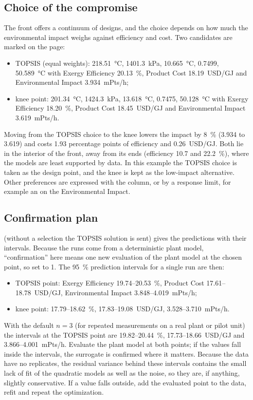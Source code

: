 \subsection{Choice of the compromise}
The front offers a continuum of designs, and the choice depends on how much the environmental impact weighs against
efficiency and cost. Two candidates are marked on the page:
\begin{itemize}
  \item TOPSIS (equal weights): 218.51~°C, 1401.3~kPa, 10.665~°C, 0.7499, 50.589~°C with Exergy Efficiency 20.13~\%,
        Product Cost 18.19~USD/GJ and Environmental Impact 3.934~mPts/h;
  \item knee point: 201.34~°C, 1424.3~kPa, 13.618~°C, 0.7475, 50.128~°C with Exergy Efficiency 18.20~\%, Product
        Cost 18.45~USD/GJ and Environmental Impact 3.619~mPts/h.
\end{itemize}
Moving from the TOPSIS choice to the knee lowers the impact by 8~\% (3.934 to 3.619) and costs 1.93 percentage points
of efficiency and 0.26~USD/GJ. Both lie in the interior of the front, away from its ends (efficiency 10.7 and
22.2~\%), where the models are least supported by data. In this example the TOPSIS choice is taken as the design point,
and the knee is kept as the low-impact alternative. Other preferences are expressed with the 
column, or by a response limit, for example an  on the Environmental Impact.

\subsection{Confirmation plan}
 (without a selection the TOPSIS solution is sent) gives the predictions with
their intervals. Because the runs come from a deterministic plant model, ``confirmation'' here means one new evaluation
of the plant model at the chosen point, so set  to 1. The 95~\% prediction
intervals for a single run are then:
\begin{itemize}
  \item TOPSIS point: Exergy Efficiency 19.74--20.53~\%, Product Cost 17.61--18.78~USD/GJ, Environmental Impact
        3.848--4.019~mPts/h;
  \item knee point: 17.79--18.62~\%, 17.83--19.08~USD/GJ, 3.528--3.710~mPts/h.
\end{itemize}
With the default $n=3$ (for repeated measurements on a real plant or pilot unit) the intervals at the TOPSIS point are
19.82--20.44~\%, 17.73--18.66~USD/GJ and 3.866--4.001~mPts/h. Evaluate the plant model at both points; if the values
fall inside the intervals, the surrogate is confirmed where it matters. Because the data have no replicates, the
residual variance behind these intervals contains the small lack of fit of the quadratic models as well as the noise,
so they are, if anything, slightly conservative. If a value falls outside, add the evaluated point to the data, refit
and repeat the optimization.

